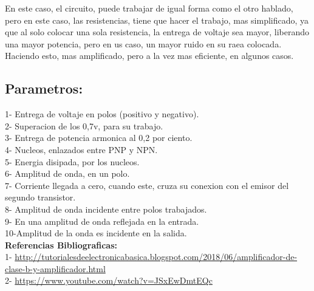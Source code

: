 \documentclass[12pt,a4paper]{article}
\begin{document}
En este caso, el circuito, puede trabajar de igual forma como el otro hablado, pero en este caso, las resistencias, tiene que hacer el trabajo, mas simplificado, ya que al solo colocar una sola resistencia, la entrega de voltaje sea mayor, liberando una mayor potencia, pero en us caso, un mayor ruido en su raea colocada. Haciendo esto, mas amplificado, pero a la vez mas eficiente, en algunos casos.\\

\subsection{Parametros:}

1- Entrega de voltaje en polos (positivo y negativo).\\
2- Superacion de los 0,7v, para su trabajo.\\
3- Entrega de potencia armonica al 0,2 por ciento.\\
4- Nucleos, enlazados entre PNP y NPN.\\
5- Energia disipada, por los nucleos.\\
6- Amplitud de onda, en un polo.\\ 
7- Corriente llegada a cero, cuando este, cruza su conexion con el emisor del segundo transistor.\\
8- Amplitud de onda incidente entre polos trabajados.\\
9- En una amplitud de onda reflejada en la entrada.\\
10-Amplitud de la onda es incidente en la salida.\\

\textbf{Referencias Bibliograficas:}\\
1- \url{http://tutorialesdeelectronicabasica.blogspot.com/2018/06/amplificador-de-clase-b-y-amplificador.html}\\
2- \url{https://www.youtube.com/watch?v=JSxEwDmtEQc}
\end{document}

